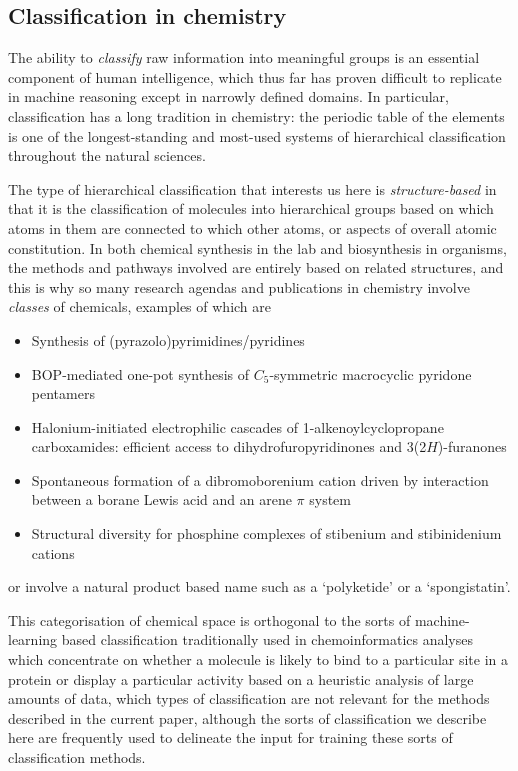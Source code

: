 \documentclass[10pt]{bmc_article}
\newenvironment{bmcformat}{\baselineskip20pt\sloppy\setboolean{publ}{false}}{\baselineskip20pt\sloppy}
\begin{document}
\begin{bmcformat}
\subsection*{Classification in chemistry}
\label{sec:backclassif}

The ability to \textit{classify} raw information into meaningful groups is an essential component of human intelligence, which thus far has proven difficult to replicate in machine reasoning except in narrowly defined domains.  In particular, classification has a long tradition in chemistry:  the periodic table of the elements is one of the longest-standing and most-used systems of hierarchical classification throughout the natural sciences.  

The type of hierarchical classification that interests us here is \textit{structure-based} in that it is the classification of molecules into hierarchical groups based on which atoms in them are connected to which other atoms, or aspects of overall atomic constitution.  In both chemical synthesis in the lab and biosynthesis in organisms, the methods and pathways involved are entirely based on related structures, and this is why so many research agendas and publications in chemistry involve \textit{classes} of chemicals, examples of which are 
\begin{itemize}
\item Synthesis of (pyrazolo)pyrimidines/pyridines
\item BOP-mediated one-pot synthesis of $C_5$-symmetric macrocyclic pyridone pentamers
\item Halonium-initiated electrophilic cascades of 1-alkenoylcyclopropane carboxamides: efficient access to dihydrofuropyridinones and 3(2$H$)-furanones
\item Spontaneous formation of a dibromoborenium cation driven by interaction between a borane Lewis acid and an arene $\pi$ system
\item Structural diversity for phosphine complexes of stibenium and stibinidenium cations
\end{itemize}
or involve a natural product based name such as a `polyketide' or a `spongistatin'.  

This categorisation of chemical space is orthogonal to the sorts of machine-learning based classification traditionally used in chemoinformatics analyses which concentrate on whether a molecule is likely to bind to a particular site in a protein or display a particular activity based on a heuristic analysis of large amounts of data, which types of classification are not relevant for the methods described in the current paper, although the sorts of classification we describe here are frequently used to delineate the input for training these sorts of classification methods.  


\end{bmcformat}
\end{document}
